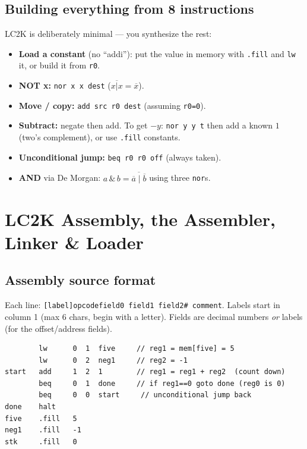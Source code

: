 \documentclass[10pt]{article}
\newcommand{\code}[1]{\texttt{\small #1}}
\begin{document}
\subsection{Building everything from 8 instructions}
LC2K is deliberately minimal --- you synthesize the rest:
\begin{itemize}
\item \textbf{Load a constant} (no ``addi''): put the value in memory with \code{.fill} and
\code{lw} it, or build it from \code{r0}.
\item \textbf{NOT x:} \code{nor x x dest} ($\overline{x|x}=\overline{x}$).
\item \textbf{Move / copy:} \code{add src r0 dest} (assuming \code{r0=0}).
\item \textbf{Subtract:} negate then add. To get $-y$: \code{nor y y t} then add a known $1$
(two's complement), or use \code{.fill} constants.
\item \textbf{Unconditional jump:} \code{beq r0 r0 off} (always taken).
\item \textbf{AND} via De Morgan: $a\,\&\,b = \overline{\overline{a}\mid\overline{b}}$ using three \code{nor}s.
\end{itemize}

\section{LC2K Assembly, the Assembler, Linker \& Loader}

\subsection{Assembly source format}
Each line: \code{[label]\quad opcode\quad field0 field1 field2\quad \# comment}.
Labels start in column 1 (max 6 chars, begin with a letter). Fields are decimal numbers
\emph{or} labels (for the offset/address fields).

\begin{lstlisting}
        lw      0  1  five     // reg1 = mem[five] = 5
        lw      0  2  neg1     // reg2 = -1
start   add     1  2  1        // reg1 = reg1 + reg2  (count down)
        beq     0  1  done     // if reg1==0 goto done (reg0 is 0)
        beq     0  0  start     // unconditional jump back
done    halt
five    .fill   5
neg1    .fill   -1
stk     .fill   0
\end{lstlisting}
\end{document}
